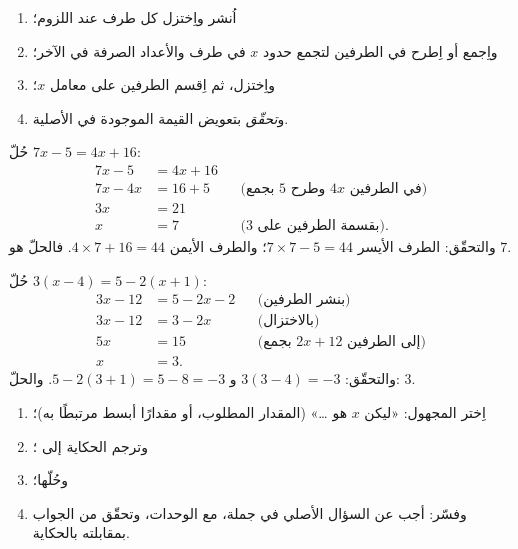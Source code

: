 \begin{method}\label{met:g8:equations:solve}
\begin{enumerate}
  \item اُنشر واِختزل كل طرف عند اللزوم؛
  \item واِجمع أو اِطرح في الطرفين لتجمع حدود $x$ في طرف
        والأعداد الصرفة في الآخر؛
  \item واِختزل، ثم اِقسم الطرفين على معامل $x$؛
  \item و\emph{تحقّق} بتعويض القيمة الموجودة في 
        الأصلية.
\end{enumerate}
\end{method}

\begin{example}\label{ex:g8:equations:solve}
حُلّ $7x - 5 = 4x + 16$:
\begin{align*}
7x - 5 &= 4x + 16 \\
7x - 4x &= 16 + 5
&& \text{(بجمع $5$ وطرح $4x$ في الطرفين)} \\
3x &= 21 \\
x &= 7 && \text{(بقسمة الطرفين على 3).}
\end{align*}
والتحقّق: الطرف الأيسر $7 \times 7 - 5 = 44$؛ والطرف الأيمن
$4 \times 7 + 16 = 44$. فالحلّ هو $7$.
\end{example}

\begin{example}\label{ex:g8:equations:brackets}
حُلّ $3(x - 4) = 5 - 2(x + 1)$:
\begin{align*}
3x - 12 &= 5 - 2x - 2 && \text{(بنشر الطرفين)} \\
3x - 12 &= 3 - 2x && \text{(بالاختزال)} \\
5x &= 15 && \text{(بجمع $2x + 12$ إلى الطرفين)} \\
x &= 3 .
\end{align*}
والتحقّق: $3(3 - 4) = -3$ و $5 - 2(3+1) = 5 - 8 = -3$. \quad والحلّ:
$3$.
\end{example}

\begin{method}\label{met:g8:equations:problem}
\begin{enumerate}
  \item اِختر المجهول: «ليكن $x$ هو \dots» (المقدار المطلوب،
        أو مقدارًا أبسط مرتبطًا به)؛
  \item وترجم الحكاية إلى ؛
  \item وحُلّها؛
  \item وفسّر: أجب عن السؤال الأصلي في جملة، مع
        الوحدات، وتحقّق من الجواب بمقابلته بالحكاية.
\end{enumerate}
\end{method}

